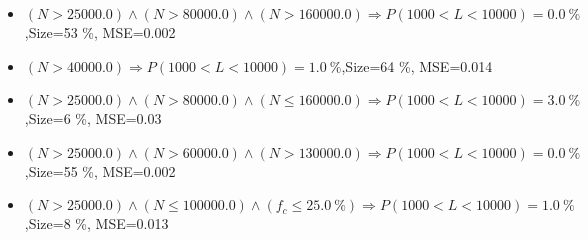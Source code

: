 \documentclass[numbered]{CSL}
\begin{document}
\begin{itemize}
\item $(N > 25000.0) \land (N > 80000.0) \land (N > 160000.0) \Rightarrow P(1 000 < L < 10 000) = 0.0~\%$,\hfill Size=53 \%, MSE=0.002
\item $(N > 40000.0) \Rightarrow P(1 000 < L < 10 000) = 1.0~\%$,\hfill Size=64 \%, MSE=0.014
\item $(N > 25000.0) \land (N > 80000.0) \land (N \leq 160000.0) \Rightarrow P(1 000 < L < 10 000) = 3.0~\%$,\hfill Size=6 \%, MSE=0.03
\item $(N > 25000.0) \land (N > 60000.0) \land (N > 130000.0) \Rightarrow P(1 000 < L < 10 000) = 0.0~\%$,\hfill Size=55 \%, MSE=0.002
\item $(N > 25000.0) \land (N \leq 100000.0) \land (f_c \leq 25.0~\%) \Rightarrow P(1 000 < L < 10 000) = 1.0~\%$,\hfill Size=8 \%, MSE=0.013
\end{itemize}
\end{document}
